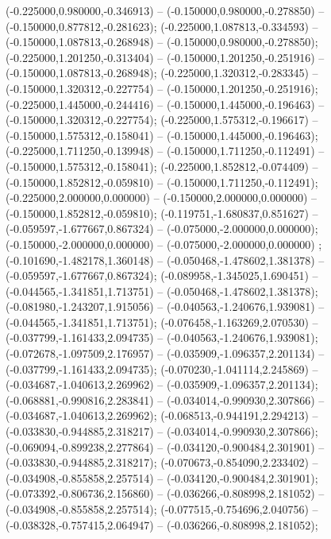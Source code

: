  (-0.225000,0.980000,-0.346913) -- (-0.150000,0.980000,-0.278850) -- (-0.150000,0.877812,-0.281623);
 (-0.225000,1.087813,-0.334593) -- (-0.150000,1.087813,-0.268948) -- (-0.150000,0.980000,-0.278850);
 (-0.225000,1.201250,-0.313404) -- (-0.150000,1.201250,-0.251916) -- (-0.150000,1.087813,-0.268948);
 (-0.225000,1.320312,-0.283345) -- (-0.150000,1.320312,-0.227754) -- (-0.150000,1.201250,-0.251916);
 (-0.225000,1.445000,-0.244416) -- (-0.150000,1.445000,-0.196463) -- (-0.150000,1.320312,-0.227754);
 (-0.225000,1.575312,-0.196617) -- (-0.150000,1.575312,-0.158041) -- (-0.150000,1.445000,-0.196463);
 (-0.225000,1.711250,-0.139948) -- (-0.150000,1.711250,-0.112491) -- (-0.150000,1.575312,-0.158041);
 (-0.225000,1.852812,-0.074409) -- (-0.150000,1.852812,-0.059810) -- (-0.150000,1.711250,-0.112491);
 (-0.225000,2.000000,0.000000) -- (-0.150000,2.000000,0.000000) -- (-0.150000,1.852812,-0.059810);
 (-0.119751,-1.680837,0.851627) -- (-0.059597,-1.677667,0.867324) -- (-0.075000,-2.000000,0.000000);
 (-0.150000,-2.000000,0.000000) -- (-0.075000,-2.000000,0.000000) ;
 (-0.101690,-1.482178,1.360148) -- (-0.050468,-1.478602,1.381378) -- (-0.059597,-1.677667,0.867324);
 (-0.089958,-1.345025,1.690451) -- (-0.044565,-1.341851,1.713751) -- (-0.050468,-1.478602,1.381378);
 (-0.081980,-1.243207,1.915056) -- (-0.040563,-1.240676,1.939081) -- (-0.044565,-1.341851,1.713751);
 (-0.076458,-1.163269,2.070530) -- (-0.037799,-1.161433,2.094735) -- (-0.040563,-1.240676,1.939081);
 (-0.072678,-1.097509,2.176957) -- (-0.035909,-1.096357,2.201134) -- (-0.037799,-1.161433,2.094735);
 (-0.070230,-1.041114,2.245869) -- (-0.034687,-1.040613,2.269962) -- (-0.035909,-1.096357,2.201134);
 (-0.068881,-0.990816,2.283841) -- (-0.034014,-0.990930,2.307866) -- (-0.034687,-1.040613,2.269962);
 (-0.068513,-0.944191,2.294213) -- (-0.033830,-0.944885,2.318217) -- (-0.034014,-0.990930,2.307866);
 (-0.069094,-0.899238,2.277864) -- (-0.034120,-0.900484,2.301901) -- (-0.033830,-0.944885,2.318217);
 (-0.070673,-0.854090,2.233402) -- (-0.034908,-0.855858,2.257514) -- (-0.034120,-0.900484,2.301901);
 (-0.073392,-0.806736,2.156860) -- (-0.036266,-0.808998,2.181052) -- (-0.034908,-0.855858,2.257514);
 (-0.077515,-0.754696,2.040756) -- (-0.038328,-0.757415,2.064947) -- (-0.036266,-0.808998,2.181052);
